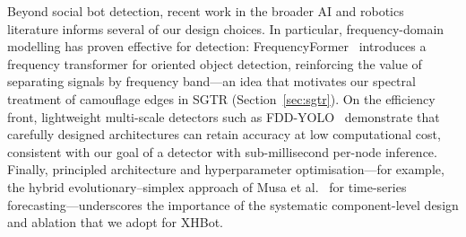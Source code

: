 Beyond social bot detection, recent work in the broader AI and robotics literature
informs several of our design choices. In particular, frequency-domain modelling has
proven effective for detection: FrequencyFormer~\cite{liu2025frequencyformer}
introduces a frequency transformer for oriented object detection, reinforcing the
value of separating signals by frequency band---an idea that motivates our spectral
treatment of camouflage edges in SGTR (Section~\ref{sec:sgtr}). On the efficiency
front, lightweight multi-scale detectors such as
FDD-YOLO~\cite{xue2025fddyolo} demonstrate that carefully designed architectures can
retain accuracy at low computational cost, consistent with our goal of a detector
with sub-millisecond per-node inference. Finally, principled architecture and
hyperparameter optimisation---for example, the hybrid evolutionary--simplex approach
of Musa et al.~\cite{musa2025optimizing} for time-series forecasting---underscores the
importance of the systematic component-level design and ablation that we adopt for
XHBot.